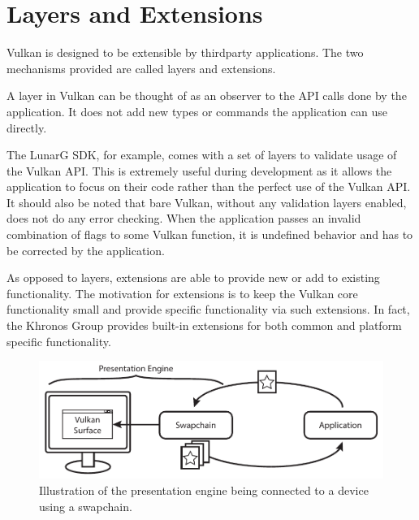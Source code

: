   \section{Layers and Extensions}
  \label{sec:LayersAndExtensions}

    Vulkan is designed to be extensible by thirdparty \glspl{application}. The two mechanisms provided are called layers and extensions.

    A layer in Vulkan can be thought of as an observer to the API calls done by the \gls{application}. It does not add new types or commands the \gls{application} can use directly.


    The LunarG SDK, for example, comes with a set of layers to validate usage of the Vulkan API. This is extremely useful during development as it allows the \gls{application} to focus on their code rather than the perfect use of the Vulkan API. It should also be noted that bare Vulkan, without any validation layers enabled, does not do any error checking. When the \gls{application} passes an invalid combination of flags to some Vulkan function, it is undefined behavior and has to be corrected by the \gls{application}.


    As opposed to layers, extensions are able to provide new or add to existing functionality. The motivation for extensions is to keep the Vulkan core functionality small and provide specific functionality via such extensions. In fact, the Khronos Group provides built-in extensions for both common and platform specific functionality.

    \begin{figure}
      \centering
      \includegraphics[width=\textwidth]{Main/Images/PresentationEngine}
      \caption{Illustration of the presentation engine being connected to a device using a swapchain.}
      \label{fig:PresentationEngine}
    \end{figure}

